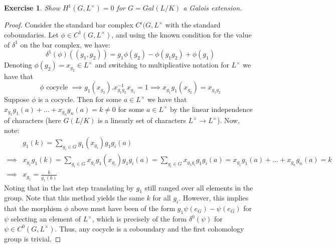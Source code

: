 \documentclass{article}
\newtheorem{exercise}{Exercise}
\begin{document}
\begin{exercise}
  Show $H^{1}(G, L^{\times}) = 0$ for $G = Gal(L/K)$ a Galois extension.
\end{exercise}
\begin{proof}
  Consider the standard bar complex $C^{i}(G,L^{\times}$ with the standard coboundaries. Let $\phi \in C^{1}(G,L^{\times})$, and using the known condition for the value of $\delta^{1}$ on the bar complex, we have:
 \[
     \delta^{1}(\phi)((g_{1},g_{2})) = g_{1}\phi(g_{2}) - \phi(g_{1}g_{2}) + \phi(g_{1}) 
   \]
   Denoting $\phi(g_{2}) = x_{g_{2}} \in L^{\times}$ and switching to multiplicative notation for $L^{\times}$ we have that
   \[
     \phi \text{\ cocycle }\implies g_{1}(x_{g_{2}}).x_{g_{1}g_{2}}^{-1}x_{g_{1}} = 1 \implies x_{g_{1}}g_{1}(x_{g_{2}}) = x_{g_{1}g_{2}} \]
   Suppose $\phi$ is a cocycle. Then for some $a \in L^{\times}$ we have that $x_{g_{1}}g_{1}(a) + ... + x_{g_{n}}g_{n}(a) = k \neq 0$ for some $a \in L^{\times}$ by the linear independence of characters (here $G(L/K)$ is a linearly set of characters $L^{\times} \to L^{\times}$). Now, note:
   \begin{align*}
     & g_{1}(k) = \sum_{g_{i} \in G}g_{1}(x_{g_{i}}) g_{1}g_{i}(a) \\
     \implies & x_{g_{1}}g_{1}(k) = \sum_{g_{i} \in G}x_{g_{1}}g_{1}(x_{g_{i}}) g_{1}g_{i}(a) = \sum_{g_{i} \in G}x_{g_{1}g_{i}} g_{1}g_{i}(a) = x_{g_{1}}g_{1}(a) + ... + x_{g_{n}}g_{n}(a) = k \\
     \implies & x_{g_{1}} = \frac{k}{g_{1}(k)}
   \end{align*}
   Noting that in the last step translating by $g_{1}$ still ranged over all elements in the group. Note that this method yields the same $k$ for all $g_{i}$. However, this implies that the morphism $\phi$ above must have been of the form $g_{1}\psi(e_{G}) - \psi(e_{G})$ for $\psi$ selecting an element of $L^{\times}$, which is precisely of the form $\delta^{0}(\psi)$ for $\psi \in C^{0}(G,L^{\times})$. Thus, any cocycle is a coboundary and the first cohomology group is trivial.
\end{proof}
\end{document}
